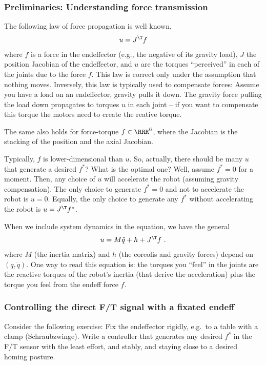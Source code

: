\documentclass[10pt,fleqn,twoside]{article}
\begin{document}
{{\subsubsection{Preliminaries: Understanding force transmission}

The following law of force propagation is well known,
\begin{align}\label{eqForce}
u = J^\T f
\end{align}
where $f$ is a force in the endeffector (e.g., the negative
of its gravity load), $J$ the position Jacobian of the endeffector,
and $u$ are the torques ``perceived'' in each of the joints due to the
force $f$. This law is correct only under the assumption that nothing
moves. Inversely, this law is typically used to compensate forces:
Assume you have a load on an endeffector, gravity pulls it down. The
gravity force pulling the load down propagates to torques $u$ in each
joint -- if you want to compensate this torque the motors need to
create the reative torque.

The same also holds for force-torque $f\in\RRR^6$, where the Jacobian
is the stacking of the position and the axial Jacobian.

Typically, $f$ is lower-dimensional than $u$. So, actually, there
should be many $u$ that generate a desired $f^*$? What is the optimal
one? Well, assume $f^*=0$ for a moment. Then, any choice of $u$ will
accelerate the robot (assuming gravity compensation). The only choice
to generate $f^*=0$ and not to accelerate the robot is $u=0$. Equally,
the only choice to generate any $f^*$ without accelerating the robot
is $u = J^\T f^*$.

When we include system dynamics in the equation, we have the general
\begin{align}\label{eqDyn}
u = M \ddot q + h + J^\T f ~.
\end{align}
where $M$ (the inertia matrix) and $h$ (the coreolis and gravity
forces) depend on $(q,\dot q)$. One way to read this equation is: the
torques you ``feel'' in the joints are the reactive torques of the
robot's inertia (that derive the acceleration) plus the torque you
feel from the endeff force $f$.


\subsubsection{Controlling the direct F/T signal with a fixated endeff}

Consider the following exercise: Fix the endeffector rigidly, e.g.\ to
a table with a clamp (Schraubzwinge). Write a controller that
generates any desired $f^*$ in the F/T sensor with the least effort,
and stably, and staying close to a desired homing posture.

}}
\end{document}
